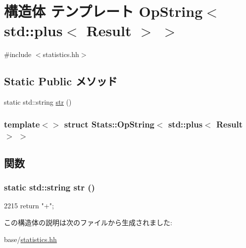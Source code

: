 \hypertarget{structStats_1_1OpString_3_01std_1_1plus_3_01Result_01_4_01_4}{
\section{構造体 テンプレート OpString$<$ std::plus$<$ Result $>$ $>$}
\label{structStats_1_1OpString_3_01std_1_1plus_3_01Result_01_4_01_4}
}


{\ttfamily \#include $<$statistics.hh$>$}\subsection*{Static Public メソッド}
\begin{DoxyCompactItemize}
\item 
static std::string \hyperlink{structStats_1_1OpString_3_01std_1_1plus_3_01Result_01_4_01_4_ac257b778f78be168137f5dc30893349b}{str} ()
\end{DoxyCompactItemize}
\subsubsection*{template$<$$>$ struct Stats::OpString$<$ std::plus$<$ Result $>$ $>$}



\subsection{関数}
\hypertarget{structStats_1_1OpString_3_01std_1_1plus_3_01Result_01_4_01_4_ac257b778f78be168137f5dc30893349b}{
\subsubsection[{str}]{\setlength{\rightskip}{0pt plus 5cm}static std::string str ()}}
\label{structStats_1_1OpString_3_01std_1_1plus_3_01Result_01_4_01_4_ac257b778f78be168137f5dc30893349b}



\begin{DoxyCode}
2215 { return "+"; }
\end{DoxyCode}


この構造体の説明は次のファイルから生成されました:\begin{DoxyCompactItemize}
\item 
base/\hyperlink{statistics_8hh}{statistics.hh}\end{DoxyCompactItemize}

